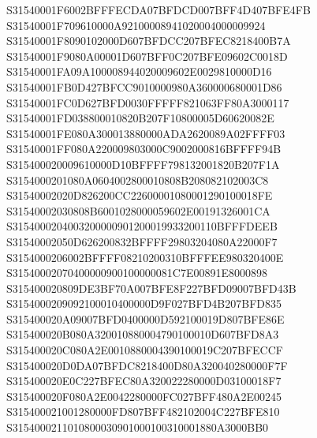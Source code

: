 \documentclass[12pt,a4paper]{article}
\begin{document}
\begin{framed}
{S31540001F6002BFFFECDA07BFDCD007BFF4D407BFE4FB\newline
S31540001F709610000A92100008941020004000009924\newline
S31540001F8090102000D607BFDCC207BFEC8218400B7A\newline
S31540001F9080A00001D607BFF0C207BFE09602C0018D\newline
S31540001FA09A100008944020009602E0029810000D16\newline
S31540001FB0D427BFCC9010000980A360000680001D86\newline
S31540001FC0D627BFD0030FFFFF821063FF80A3000117\newline
S31540001FD038800010820B207F10800005D60620082E\newline
S31540001FE080A300013880000ADA2620089A02FFFF03\newline
S31540001FF080A220009803000C9002000816BFFFF94B\newline
S315400020009610000D10BFFFF798132001820B207F1A\newline
S3154000201080A0604002800010808B208082102003C8\newline
S31540002020D826200CC22600001080001290100018FE\newline
S31540002030808B6001028000059602E00191326001CA\newline
S3154000204003200000901200019933200110BFFFDEEB\newline
S31540002050D626200832BFFFF29803204080A22000F7\newline
S3154000206002BFFFF08210200310BFFFEE980320400E\newline
S31540002070400000900100000081C7E00891E8000898\newline
S315400020809DE3BF70A007BFE8F227BFD09007BFD43B\newline
S3154000209092100010400000D9F027BFD4B207BFD835\newline
S315400020A09007BFD0400000D592100019D807BFE86E\newline
S315400020B080A320010880004790100010D607BFD8A3\newline
S315400020C080A2E0010880004390100019C207BFECCF\newline
S315400020D0DA07BFDC8218400D80A320040280000F7F\newline
S315400020E0C227BFEC80A320022280000D03100018F7\newline
S315400020F080A2E0042280000FC027BFF480A2E00245\newline
S315400021001280000FD807BFF482102004C227BFE810\newline
S3154000211010800030901000100310001880A3000BB0\newline
}
\end{framed}
\end{document}
